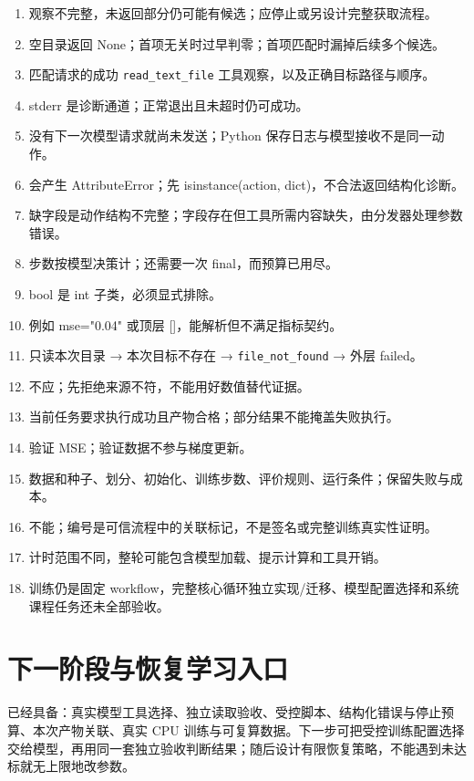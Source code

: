 \documentclass[UTF8,zihao=-4,fontset=fandol]{ctexart}
\begin{document}
\begin{enumerate}
\item 观察不完整，未返回部分仍可能有候选；应停止或另设计完整获取流程。
\item 空目录返回 None；首项无关时过早判零；首项匹配时漏掉后续多个候选。
\item 匹配请求的成功 \nolinkurl{read_text_file} 工具观察，以及正确目标路径与顺序。
\item stderr 是诊断通道；正常退出且未超时仍可成功。
\item 没有下一次模型请求就尚未发送；Python 保存日志与模型接收不是同一动作。
\item 会产生 AttributeError；先 isinstance(action, dict)，不合法返回结构化诊断。
\item 缺字段是动作结构不完整；字段存在但工具所需内容缺失，由分发器处理参数错误。
\item 步数按模型决策计；还需要一次 final，而预算已用尽。
\item bool 是 int 子类，必须显式排除。
\item 例如 mse="0.04" 或顶层 []，能解析但不满足指标契约。
\item 只读本次目录 → 本次目标不存在 → \nolinkurl{file_not_found} → 外层 failed。
\item 不应；先拒绝来源不符，不能用好数值替代证据。
\item 当前任务要求执行成功且产物合格；部分结果不能掩盖失败执行。
\item 验证 MSE；验证数据不参与梯度更新。
\item 数据和种子、划分、初始化、训练步数、评价规则、运行条件；保留失败与成本。
\item 不能；编号是可信流程中的关联标记，不是签名或完整训练真实性证明。
\item 计时范围不同，整轮可能包含模型加载、提示计算和工具开销。
\item 训练仍是固定 workflow，完整核心循环独立实现/迁移、模型配置选择和系统课程任务还未全部验收。
\end{enumerate}

\section{下一阶段与恢复学习入口}

已经具备：真实模型工具选择、独立读取验收、受控脚本、结构化错误与停止预算、本次产物关联、真实 CPU 训练与可复算数据。下一步可把受控训练配置选择交给模型，再用同一套独立验收判断结果；随后设计有限恢复策略，不能遇到未达标就无上限地改参数。
\end{document}
